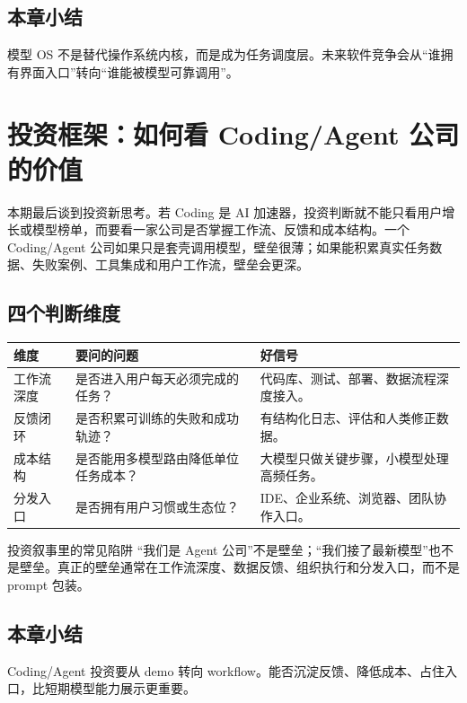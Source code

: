 \documentclass[a4paper]{article}
\begin{document}
\subsection{本章小结}

模型 OS 不是替代操作系统内核，而是成为任务调度层。未来软件竞争会从“谁拥有界面入口”转向“谁能被模型可靠调用”。

\section{投资框架：如何看 Coding/Agent 公司的价值}

本期最后谈到投资新思考。若 Coding 是 AI 加速器，投资判断就不能只看用户增长或模型榜单，而要看一家公司是否掌握工作流、反馈和成本结构。一个 Coding/Agent 公司如果只是套壳调用模型，壁垒很薄；如果能积累真实任务数据、失败案例、工具集成和用户工作流，壁垒会更深。

\subsection{四个判断维度}

\noindent\begin{tabularx}{\textwidth}{p{}p{}X}
\toprule
维度 & 要问的问题 & 好信号 \\
\midrule
工作流深度 & 是否进入用户每天必须完成的任务？ & 代码库、测试、部署、数据流程深度接入。 \\
反馈闭环 & 是否积累可训练的失败和成功轨迹？ & 有结构化日志、评估和人类修正数据。 \\
成本结构 & 是否能用多模型路由降低单位任务成本？ & 大模型只做关键步骤，小模型处理高频任务。 \\
分发入口 & 是否拥有用户习惯或生态位？ & IDE、企业系统、浏览器、团队协作入口。 \\
\bottomrule
\end{tabularx}

\begin{warningbox}{投资叙事里的常见陷阱}
“我们是 Agent 公司”不是壁垒；“我们接了最新模型”也不是壁垒。真正的壁垒通常在工作流深度、数据反馈、组织执行和分发入口，而不是 prompt 包装。
\end{warningbox}

\subsection{本章小结}

Coding/Agent 投资要从 demo 转向 workflow。能否沉淀反馈、降低成本、占住入口，比短期模型能力展示更重要。
\end{document}
